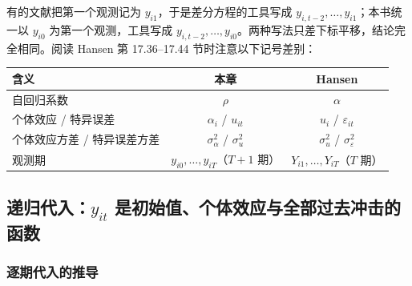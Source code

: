 有的文献把第一个观测记为 $y_{i1}$，于是差分方程的工具写成 $y_{i,t-2},\dots,y_{i1}$；本书统一以 $y_{i0}$ 为第一个观测，工具写成 $y_{i,t-2},\dots,y_{i0}$。两种写法只差下标平移，结论完全相同。阅读 Hansen 第 17.36–17.44 节时注意以下记号差别：

\begin{center}
\begin{minipage}{\linewidth}\centering\small
{}
\begin{tabularx}{0.86\linewidth}{Lcc}
\toprule
含义 & 本章 & Hansen\\
\midrule
自回归系数 & $\rho$ & $\alpha$\\
个体效应 / 特异误差 & $\alpha_i$ / $u_{it}$ & $u_i$ / $\varepsilon_{it}$\\
个体效应方差 / 特异误差方差 & $\sigma_\alpha^2$ / $\sigma_u^2$ & $\sigma_u^2$ / $\sigma_\varepsilon^2$\\
观测期 & $y_{i0},\dots,y_{iT}$（$T+1$ 期） & $Y_{i1},\dots,Y_{iT}$（$T$ 期）\\
\bottomrule
\end{tabularx}
\end{minipage}
\end{center}

\subsection{递归代入：\texorpdfstring{$y_{it}$}{y\_it} 是初始值、个体效应与全部过去冲击的函数}\label{sec:U12a-recur}

\subsubsection{逐期代入的推导}

